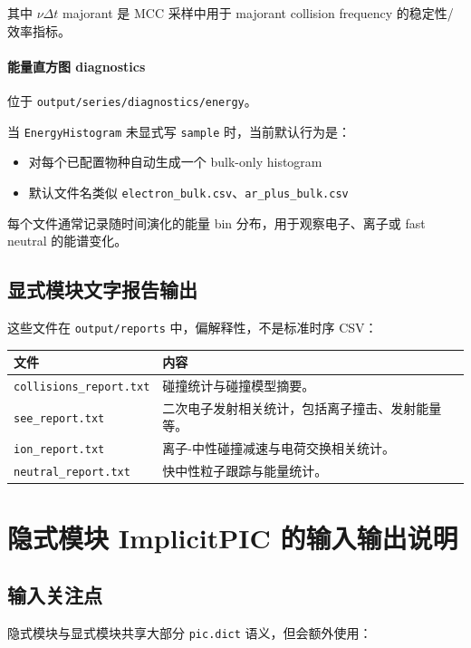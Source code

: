 \documentclass[11pt,a4paper]{ctexart}
\newcommand{\code}[1]{\texttt{#1}}
\newcommand{\file}[1]{\texttt{#1}}
\newcommand{\dir}[1]{\texttt{#1}}
\newcommand{\sym}[1]{\ensuremath{#1}}
\begin{document}
其中 \sym{\nu \Delta t} majorant 是 MCC 采样中用于 majorant collision frequency 的稳定性/效率指标。

\paragraph{能量直方图 diagnostics}

位于 \dir{output/series/diagnostics/energy}。

当 \code{EnergyHistogram} 未显式写 \code{sample} 时，当前默认行为是：

\begin{itemize}
  \item 对每个已配置物种自动生成一个 bulk-only histogram
  \item 默认文件名类似 \file{electron\_bulk.csv}、\file{ar\_plus\_bulk.csv}
\end{itemize}

每个文件通常记录随时间演化的能量 bin 分布，用于观察电子、离子或 fast neutral 的能谱变化。

\subsection{显式模块文字报告输出}

这些文件在 \dir{output/reports} 中，偏解释性，不是标准时序 CSV：

\begin{longtable}{p{}p{}}
\toprule
文件 & 内容 \\
\midrule
\endhead
\file{collisions\_report.txt} & 碰撞统计与碰撞模型摘要。 \\
\file{see\_report.txt} & 二次电子发射相关统计，包括离子撞击、发射能量等。 \\
\file{ion\_report.txt} & 离子-中性碰撞减速与电荷交换相关统计。 \\
\file{neutral\_report.txt} & 快中性粒子跟踪与能量统计。 \\
\bottomrule
\end{longtable}

\section{隐式模块 ImplicitPIC 的输入输出说明}

\subsection{输入关注点}

隐式模块与显式模块共享大部分 \code{pic.dict} 语义，但会额外使用：
\end{document}
